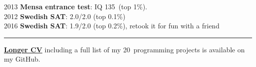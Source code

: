 \documentclass[10pt,letterpaper]{article}
\newcommand{\PLUS}
{\nolinebreak[4]\hspace{-.05em}\raisebox{.22ex}{\footnotesize\bf +}}
\begin{document}
2013 \textbf{Mensa entrance test}: IQ 135\PLUS \ (top 1\%). \\
2012 \textbf{Swedish SAT}: 2.0/2.0 (top 0.1\%) \\
2016 \textbf{Swedish SAT}: 1.9/2.0 (top 0.2\%), retook it for fun with a friend

\vspace{1em}
\hrule
\vspace{1em}

\large{{\href{https://github.com/jakkdl/resume}{\textbf{Longer CV}}}} \normalsize{including a full list of my 20\PLUS \ programming projects is available on my GitHub.}
\end{document}

